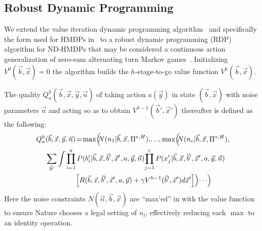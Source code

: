  
\subsection{Robust Dynamic Programming}

We extend the value iteration dynamic programming
algorithm~\cite{bellman} and specifically the form used for HMDPs
in~\cite{sdp_aaai} to a robust dynamic programming (RDP) algorithm for
ND-HMDPs that may be considered a continuous action generalization of
zero-sum alternating turn Markov games~\cite{littman94}.  Initializing
$V^0(\vec{b},\vec{x}) = 0$ the algorithm builds the $h$-stage-to-go
value function $V^h(\vec{b},\vec{x})$.

The quality $Q_a^{h}(\vec{b},\vec{x},\vec{y},\vec{n})$ of taking
action $a(\vec{y})$ in state $(\vec{b},\vec{x})$ with noise parameters
$\vec{n}$ and acting so as to obtain $V^{h-1}(\vec{b}',\vec{x}')$ thereafter 
is defined as the following:
{\footnotesize
\begin{align}
Q_a^{h}&(\vec{b},\vec{x},\vec{y},\vec{n}) \! = \!
\max\!\Big(\!\!N(n_1|\vec{b},\vec{x},\Pi^{*,H}),\!\ldots\!, \max\!\Big(\!\!N(n_e|\vec{b},\vec{x},\Pi^{*,H}), \nonumber \\
& 
\sum_{\vec{b}'} \int \prod_{i=1}^a P(b_i'|\vec{b},\vec{x},\vec{b}',\vec{x}',a,\vec{y},\vec{n}) \!
\prod_{j=1}^c P(x_j'|\vec{b},\vec{x},\vec{b}',\vec{x}',a,\vec{y},\vec{n}) \! \nonumber \\
& \qquad \qquad \; \Big[ R(\vec{b},\vec{x},\vec{b}',\vec{x}',a,\vec{y}) + \gamma V^{h-1}(\vec{b}',\vec{x}') d\vec{x}' \Big] \Big) \! \cdots \! \Big) \hspace{-2mm} \label{eq:qfun}
\end{align}}
Here the noise constraints $N(\vec{n},\vec{b},\vec{x})$ are ``max'ed''
in with the value function to ensure Nature chooses a legal setting 
of $n_l$, effectively reducing each $\max$ to an identity operation.  

